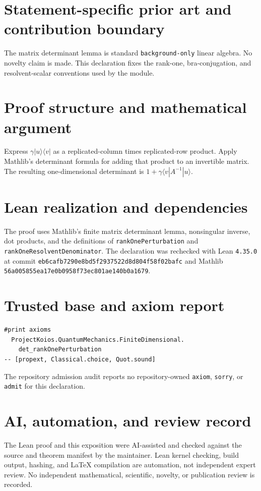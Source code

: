 \documentclass[11pt]{article}
\begin{document}
\section{Statement-specific prior art and contribution boundary}
The matrix determinant lemma is standard \texttt{background-only} linear algebra.  No novelty claim is made.  This declaration fixes the rank-one, bra-conjugation, and resolvent-scalar conventions used by the module.

\section{Proof structure and mathematical argument}
Express $\gamma|u\rangle\langle v|$ as a replicated-column times replicated-row product.  Apply Mathlib's determinant formula for adding that product to an invertible matrix.  The resulting one-dimensional determinant is
$1+\gamma\langle v|A^{-1}|u\rangle$.

\section{Lean realization and dependencies}
The proof uses Mathlib's finite matrix determinant lemma, nonsingular inverse, dot products, and the definitions of \texttt{rankOnePerturbation} and \texttt{rankOneResolventDenominator}.  The declaration was rechecked with Lean \texttt{4.35.0} at commit \texttt{eb6cafb7290e8bd5f2937522d8d804f58f02bafc} and Mathlib \texttt{56a005855ea17e0b0958f73ec801ae140b0a1679}.

\section{Trusted base and axiom report}
\begin{verbatim}
#print axioms
  ProjectKoios.QuantumMechanics.FiniteDimensional.
    det_rankOnePerturbation
-- [propext, Classical.choice, Quot.sound]
\end{verbatim}
The repository admission audit reports no repository-owned \texttt{axiom}, \texttt{sorry}, or
\texttt{admit} for this declaration.

\section{AI, automation, and review record}
The Lean proof and this exposition were AI-assisted and checked against the source and theorem
manifest by the maintainer.  Lean kernel checking, build output, hashing, and LaTeX compilation are
automation, not independent expert review.  No independent mathematical, scientific, novelty, or
publication review is recorded.
\end{document}
